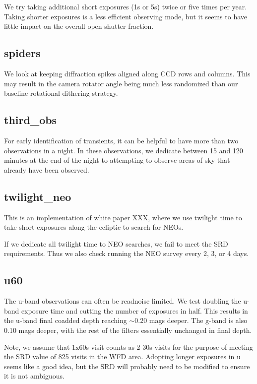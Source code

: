 We try taking additional short exposures (1s or 5s) twice or five times per year. Taking shorter exposures is a less efficient observing mode, but it seems to have little impact on the overall open shutter fraction.

\subsection{spiders}

We look at keeping diffraction spikes aligned along CCD rows and columns. This may result in the camera rotator angle being much less randomized than our baseline rotational dithering strategy.

\subsection{third\_obs}

For early identification of transients, it can be helpful to have more than two observations in a night. In these observations, we dedicate between 15 and 120 minutes at the end of the night to attempting to observe areas of sky that already have been observed.

\subsection{twilight\_neo}

This is an implementation of white paper XXX, where we use twilight time to take short exposures along the ecliptic to search for NEOs. 

If we dedicate all twilight time to NEO searches, we fail to meet the SRD requirements. Thus we also check running the NEO survey every 2, 3, or 4 days.

\subsection{u60}\label{ss:u60}
The u-band observations can often be readnoise limited. We test doubling the u-band exposure time and cutting the number of exposures in half. This results in the u-band final coadded depth reaching $\sim$0.20 mags deeper. The g-band is also 0.10 mags deeper, with the rest of the filters essentially unchanged in final depth.

Note, we assume that 1x60s visit counts as 2 30s visits for the purpose of meeting the SRD value of 825 visits in the WFD area. Adopting longer exposures in u seems like a good idea, but the SRD will probably need to be modified to ensure it is not ambiguous.

